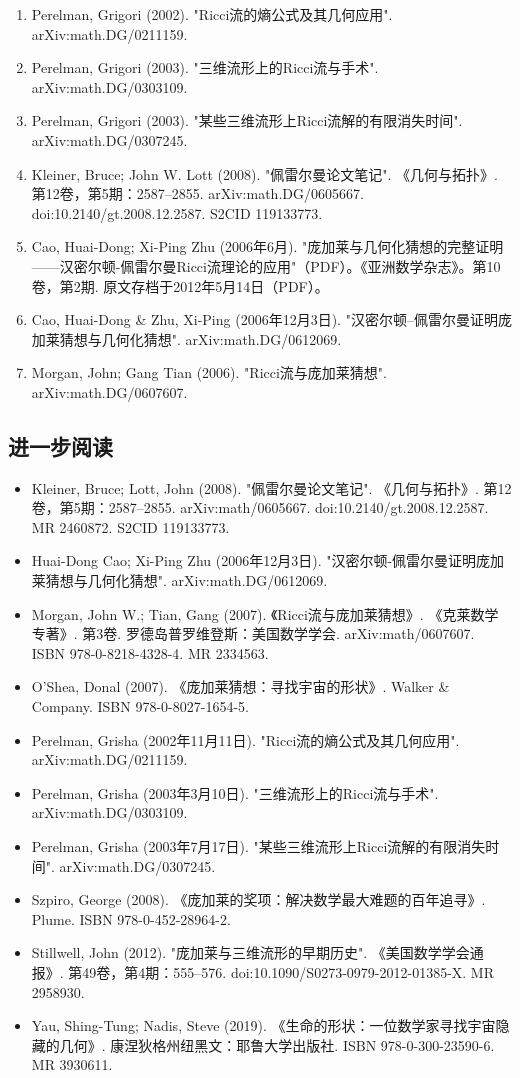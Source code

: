 \begin{enumerate}
\item Perelman, Grigori (2002). "Ricci流的熵公式及其几何应用". arXiv:math.DG/0211159.  
\item Perelman, Grigori (2003). "三维流形上的Ricci流与手术". arXiv:math.DG/0303109.  
\item Perelman, Grigori (2003). "某些三维流形上Ricci流解的有限消失时间". arXiv:math.DG/0307245.  
\item Kleiner, Bruce; John W. Lott (2008). "佩雷尔曼论文笔记". 《几何与拓扑》. 第12卷，第5期：2587–2855. arXiv:math.DG/0605667. doi:10.2140/gt.2008.12.2587. S2CID 119133773.  
\item Cao, Huai-Dong; Xi-Ping Zhu (2006年6月). "庞加莱与几何化猜想的完整证明——汉密尔顿-佩雷尔曼Ricci流理论的应用"（PDF）。《亚洲数学杂志》。第10卷，第2期. 原文存档于2012年5月14日（PDF）。  
\item Cao, Huai-Dong & Zhu, Xi-Ping (2006年12月3日). "汉密尔顿–佩雷尔曼证明庞加莱猜想与几何化猜想". arXiv:math.DG/0612069.  
\item Morgan, John; Gang Tian (2006). "Ricci流与庞加莱猜想". arXiv:math.DG/0607607.
\end{enumerate}
\subsection{进一步阅读}  
\begin{itemize}
\item Kleiner, Bruce; Lott, John (2008). "佩雷尔曼论文笔记". 《几何与拓扑》. 第12卷，第5期：2587–2855. arXiv:math/0605667. doi:10.2140/gt.2008.12.2587. MR 2460872. S2CID 119133773.  
\item Huai-Dong Cao; Xi-Ping Zhu (2006年12月3日). "汉密尔顿-佩雷尔曼证明庞加莱猜想与几何化猜想". arXiv:math.DG/0612069.  
\item Morgan, John W.; Tian, Gang (2007). 《Ricci流与庞加莱猜想》. 《克莱数学专著》. 第3卷. 罗德岛普罗维登斯：美国数学学会. arXiv:math/0607607. ISBN 978-0-8218-4328-4. MR 2334563.  
\item O'Shea, Donal (2007). 《庞加莱猜想：寻找宇宙的形状》. Walker & Company. ISBN 978-0-8027-1654-5.  
\item Perelman, Grisha (2002年11月11日). "Ricci流的熵公式及其几何应用". arXiv:math.DG/0211159.  
\item Perelman, Grisha (2003年3月10日). "三维流形上的Ricci流与手术". arXiv:math.DG/0303109.  
\item Perelman, Grisha (2003年7月17日). "某些三维流形上Ricci流解的有限消失时间". arXiv:math.DG/0307245.  
\item Szpiro, George (2008). 《庞加莱的奖项：解决数学最大难题的百年追寻》. Plume. ISBN 978-0-452-28964-2.  
\item Stillwell, John (2012). "庞加莱与三维流形的早期历史". 《美国数学学会通报》. 第49卷，第4期：555–576. doi:10.1090/S0273-0979-2012-01385-X. MR 2958930.  
\item Yau, Shing-Tung; Nadis, Steve (2019). 《生命的形状：一位数学家寻找宇宙隐藏的几何》. 康涅狄格州纽黑文：耶鲁大学出版社. ISBN 978-0-300-23590-6. MR 3930611.
\end{itemize}
